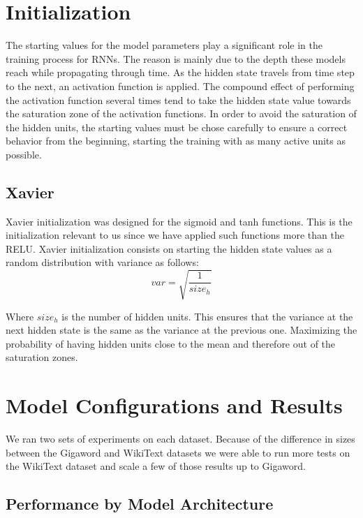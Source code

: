 \documentclass[a4paper]{article}
\begin{document}
\section{Initialization}
\label{sec:initialization}

The starting values for the model parameters play a significant role in the training process for RNNs. The reason is mainly due to the depth these models reach while propagating through time. As the hidden state travels from time step to the next, an activation function is applied. The compound effect of performing the activation function several times tend to take the hidden state value towards the saturation zone of the activation functions. In order to avoid the saturation of the hidden units, the starting values must be chose carefully to ensure a correct behavior from the beginning, starting the training with as many active units as possible.

\subsection{Xavier}
\label{sec:xavier}

Xavier initialization \cite{xavier10} was designed for the sigmoid and tanh functions. This is the initialization relevant to us since we have applied such functions more than the RELU.
Xavier initialization consists on starting the hidden state values as a random distribution with variance as follows:
$$var = \sqrt{\frac{1}{size_h}}$$

Where $size_h$ is the number of hidden units. This ensures that the variance at the next hidden state is the same as the variance at the previous one. Maximizing the probability of having hidden units close to the mean and therefore out of the saturation zones.

\section{Model Configurations and Results}
\label{sec:results}

We ran two sets of experiments on each dataset. Because of the difference in sizes
between the Gigaword and WikiText datasets we were able to run more tests on the
WikiText dataset and scale a few of those results up to Gigaword.

\subsection{Performance by Model Architecture}
\label{sec:perf_by_model_arch}
\end{document}
